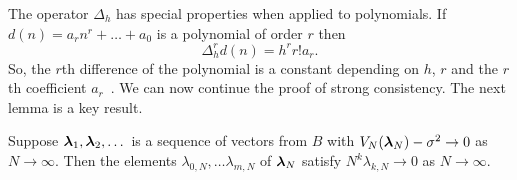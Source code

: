 \documentclass[journal]{IEEEtran}
\begin{document}
The operator $\Delta_h$ has special properties when applied to polynomials. If $d(n) = a_r n^r + \dots + a_0$ is a polynomial of order $r$ then
 \begin{equation} \label{eq:mfinitediffpoly}
 \Delta_h^r d(n) = h^r r! a_r. 
 \end{equation}
So, the $r$th difference of the polynomial is a constant depending on $h$, $r$ and the $r$th coefficient $a_r$~\cite[page 51]{Jordan_Calculus_of_finite_difference_1965}.  We can now continue the proof of strong consistency.  The next lemma is a key result.

\begin{lemma}\label{lem:moran2}
Suppose $\boldsymbol{\lambda}_1, \boldsymbol{\lambda}_2,\dots$ is a sequence of vectors from $B$ with $V_N(\boldsymbol{\lambda}_N) - \sigma^2\rightarrow 0$ as $N\rightarrow\infty$. Then the elements $\lambda_{0,N}, \dots \lambda_{m,N}$ of $\boldsymbol{\lambda}_N$ satisfy $N^k\lambda_{k, N}\rightarrow0$ as $N\rightarrow\infty$.
\end{lemma}
\end{document}
